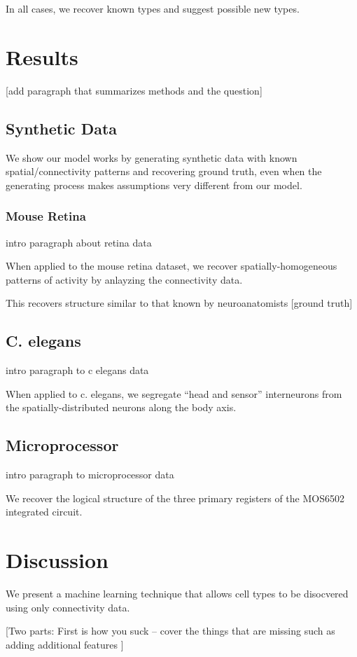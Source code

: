 \documentclass{article}
\begin{document}
In all cases, we recover known types and suggest possible new types. 


\section{Results}
[add paragraph that summarizes methods and the question]

\subsection{Synthetic Data}
We show our model works by generating synthetic data with known
spatial/connectivity patterns and recovering ground truth, even when
the generating process makes assumptions very different from our
model.

\subsubsection{Mouse Retina}
intro paragraph about retina data

When applied to the mouse retina dataset, we recover
spatially-homogeneous patterns of activity by anlayzing the
connectivity data.

This recovers structure similar to that known by neuroanatomists [ground truth]


\subsection{C. elegans}
intro paragraph to c elegans data

When applied to c. elegans, we segregate ``head and sensor'' interneurons from the spatially-distributed neurons along the body axis. 

\subsection{Microprocessor}
intro paragraph to microprocessor data 

We recover the logical structure of the three primary registers of the
MOS6502 integrated circuit.


\section{Discussion}
We present a machine learning technique that allows cell types to be
disocvered using only connectivity data. 

[Two parts: First is how you suck -- cover the things that are missing
such as adding additional features ]
\end{document}
